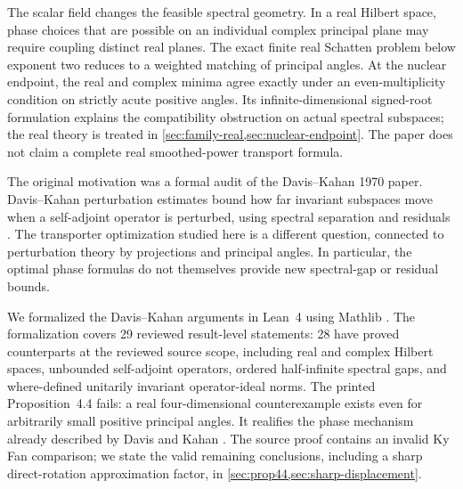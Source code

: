 \documentclass[11pt]{article}
\begin{document}
The scalar field changes the feasible spectral geometry.  In a real
Hilbert space, phase choices that are possible on an individual complex
principal plane may require coupling distinct real planes.  The exact
finite real Schatten problem below exponent two reduces to a weighted
matching of principal angles.  At the nuclear endpoint, the real
and complex minima agree exactly under an even-multiplicity condition
on strictly acute positive angles.  Its infinite-dimensional
signed-root formulation explains the compatibility obstruction on
actual spectral subspaces; the real theory is treated in
\cref{sec:family-real,sec:nuclear-endpoint}.  The paper does not claim
a complete real smoothed-power transport formula.

The original motivation was a formal audit of the Davis--Kahan 1970
paper.  Davis--Kahan perturbation estimates bound how far invariant
subspaces move when a self-adjoint operator is perturbed, using spectral
separation and residuals \citep{davis1970rotation,wedin1972perturbation}.
The transporter optimization studied here is a different question,
connected to perturbation theory by projections and principal angles.
In particular, the optimal phase formulas do not themselves provide
new spectral-gap or residual bounds.

We formalized the Davis--Kahan arguments in Lean~4 using Mathlib
\citep{demoura2021lean4,mathlib2020}.  The formalization covers 29
reviewed result-level statements: 28 have proved counterparts at
the reviewed source scope, including real and complex Hilbert spaces,
unbounded self-adjoint operators, ordered half-infinite spectral gaps,
and where-defined unitarily invariant operator-ideal norms.  The
printed Proposition~4.4 fails: a real four-dimensional counterexample
exists even for arbitrarily small positive principal angles.  It
realifies the phase mechanism already described by Davis and Kahan
\citep[Example~4.2]{davis1970rotation}.  The source proof contains an
invalid Ky Fan comparison; we state the valid remaining conclusions,
including a sharp direct-rotation approximation factor, in
\cref{sec:prop44,sec:sharp-displacement}.
\end{document}
